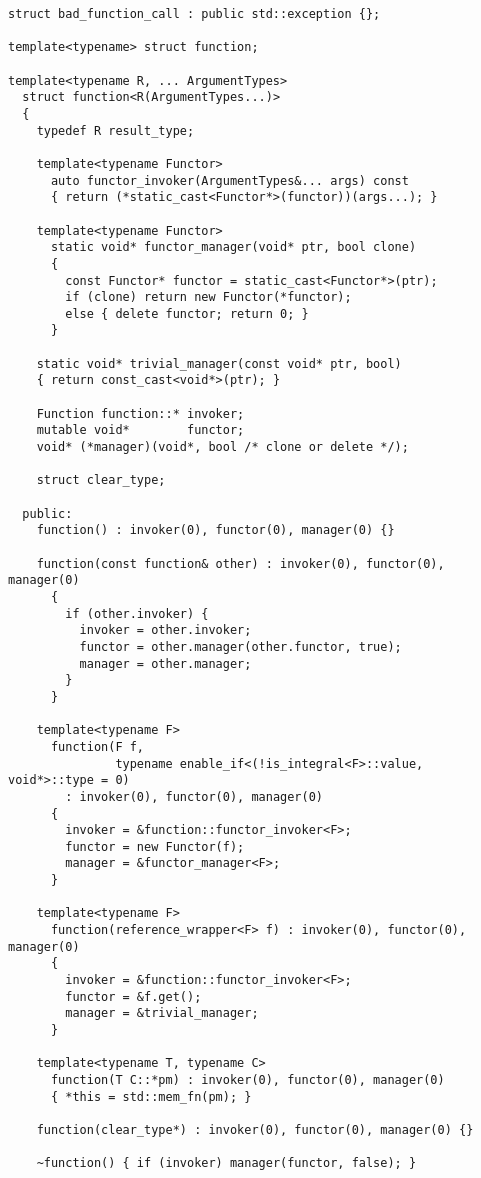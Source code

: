 \documentclass{article}
\begin{document}
\small
\begin{verbatim}
struct bad_function_call : public std::exception {};

template<typename> struct function;

template<typename R, ... ArgumentTypes>
  struct function<R(ArgumentTypes...)>
  {
    typedef R result_type;

    template<typename Functor>
      auto functor_invoker(ArgumentTypes&... args) const
      { return (*static_cast<Functor*>(functor))(args...); }
    
    template<typename Functor> 
      static void* functor_manager(void* ptr, bool clone)
      { 
        const Functor* functor = static_cast<Functor*>(ptr);
        if (clone) return new Functor(*functor); 
        else { delete functor; return 0; }
      }

    static void* trivial_manager(const void* ptr, bool)
    { return const_cast<void*>(ptr); }

    Function function::* invoker;
    mutable void*        functor;
    void* (*manager)(void*, bool /* clone or delete */);

    struct clear_type;

  public:
    function() : invoker(0), functor(0), manager(0) {}
    
    function(const function& other) : invoker(0), functor(0), manager(0)
      { 
        if (other.invoker) {
          invoker = other.invoker;
          functor = other.manager(other.functor, true);
          manager = other.manager;
        }
      }

    template<typename F> 
      function(F f, 
               typename enable_if<(!is_integral<F>::value, void*>::type = 0) 
        : invoker(0), functor(0), manager(0)
      {
        invoker = &function::functor_invoker<F>;
        functor = new Functor(f);
        manager = &functor_manager<F>;
      }

    template<typename F> 
      function(reference_wrapper<F> f) : invoker(0), functor(0), manager(0)
      { 
        invoker = &function::functor_invoker<F>;
        functor = &f.get();
        manager = &trivial_manager;
      }
    
    template<typename T, typename C> 
      function(T C::*pm) : invoker(0), functor(0), manager(0)
      { *this = std::mem_fn(pm); }

    function(clear_type*) : invoker(0), functor(0), manager(0) {}
    
    ~function() { if (invoker) manager(functor, false); }


\end{verbatim}
\end{document}
